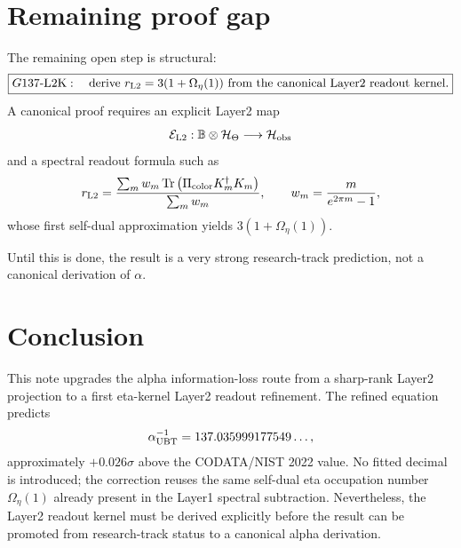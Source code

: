 \documentclass[12pt,a4paper]{article}
\begin{document}
\section{Remaining proof gap}

The remaining open step is structural:
\[
  \boxed{
  G137\text{-L2K}:
  \quad
  \text{derive }
  r_{\rm L2}=3(1+\Omega_\eta(1))
  \text{ from the canonical Layer2 readout kernel.}
  }
\]
A canonical proof requires an explicit Layer2 map
\[
  \mathcal E_{\rm L2}:
  \mathbb B\otimes\mathcal H_\Theta
  \longrightarrow
  \mathcal H_{\rm obs}
\]
and a spectral readout formula such as
\[
  r_{\rm L2}
  =
  \frac{
    \sum_m w_m\,\mathrm{Tr}
    \left(\Pi_{\rm color}K_m^\dagger K_m\right)
  }{
    \sum_m w_m
  },
  \qquad
  w_m=\frac{m}{e^{2\pi m}-1},
\]
whose first self-dual approximation yields $3(1+\Omega_\eta(1))$.

Until this is done, the result is a very strong research-track prediction, not
a canonical derivation of $\alpha$.

\section{Conclusion}

This note upgrades the alpha information-loss route from a sharp-rank Layer2
projection to a first eta-kernel Layer2 readout refinement.  The refined
equation predicts
\[
  \alpha^{-1}_{\rm UBT}=137.035999177549\ldots ,
\]
approximately $+0.026\sigma$ above the CODATA/NIST 2022 value.  No fitted
decimal is introduced; the correction reuses the same self-dual eta occupation
number $\Omega_\eta(1)$ already present in the Layer1 spectral subtraction.
Nevertheless, the Layer2 readout kernel must be derived explicitly before the
result can be promoted from research-track status to a canonical alpha
derivation.
\end{document}
